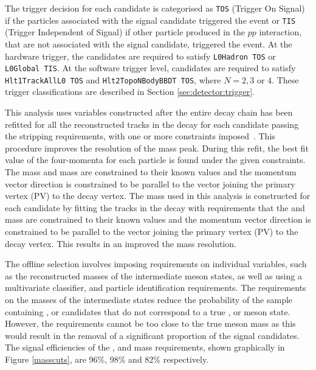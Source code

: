 The trigger decision for each candidate is categorised as {\tt TOS} (Trigger On Signal) if the particles associated with the signal candidate triggered the event or {\tt TIS} (Trigger Independent of Signal) if other particle produced in the $pp$ interaction, that are not associated with the signal candidate, triggered the event. At the hardware trigger, the \Bm candidates are required to satisfy {\tt L0Hadron TOS} or {\tt L0Global TIS}. At the software trigger level, \Bm candidates are required to satisfy {\tt Hlt1TrackAllL0 TOS} and {\tt Hlt2TopoNBodyBBDT TOS}, where $N = 2,3 \text{ or } 4$. These trigger classifications are described in Section \ref{sec:detector:trigger}.

This analysis uses variables constructed after the entire decay chain has been refitted for all the reconstructed tracks in the decay for each \Bm candidate passing the stripping requirements, with one or more constraints imposed~\cite{Hulsbergen:2005pu}. This procedure improves the resolution of the \Bm mass peak. During this refit, the best fit value of the four-momenta for each particle is found under the given constraints. The \Dz mass and \KS mass are constrained to their known values and the \Bm momentum vector direction is constrained to be parallel to the vector joining the primary vertex (PV) to the \Bm decay vertex. The \Bm mass used in this analysis is constructed for each \Bm candidate by fitting the tracks in the decay with requirements that the \Dz and \KS mass are constrained to their known values and the \Bm momentum vector direction is constrained to be parallel to the vector joining the primary vertex (PV) to the \Bm decay vertex. This results in an improved the \Bm mass resolution.

The offline selection involves imposing requirements on individual variables, such as the reconstructed masses of the intermediate meson states, as well as using a multivariate classifier, and particle identification requirements. The requirements on the masses of the intermediate states reduce the probability of the sample containing \Dz, \KS or \Kstar candidates that do not correspond to a true \Dz, \KS or \Kstar meson state. However, the requirements cannot be too close to the true meson mass as this would result in the removal of a significant proportion of the signal candidates. The signal efficiencies of the \Dz, \KS and \Kstar mass requirements, shown graphically in Figure \ref{masscuts}, are 96\%, 98\% and 82\% respectively. 

